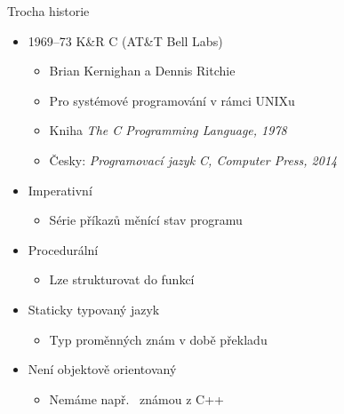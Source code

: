 \begin{frame}{Trocha historie}

  \begin{itemize}
  \item 1969--73 K\&R C (AT\&T Bell Labs)
  \begin{itemize}
    \item Brian Kernighan a Dennis Ritchie
    \item Pro systémové programování v rámci UNIXu

    \pause

    \item Kniha \textit{The C Programming Language, 1978}
    \item Česky: \textit{Programovací jazyk C, Computer Press, 2014}
  \end{itemize}

  \pause

  \item Imperativní
  \begin{itemize}
    \item Série příkazů měnící stav programu
  \end{itemize}

  \pause

  \item Procedurální
  \begin{itemize}
    \item Lze strukturovat do funkcí
  \end{itemize}

  \pause

  \item Staticky typovaný jazyk
  \begin{itemize}
    \item Typ proměnných znám v době překladu
  \end{itemize}

  \pause

  \item Není objektově orientovaný
  \begin{itemize}
    \item Nemáme např.\  známou z C++
  \end{itemize}
 \end{itemize}

\end{frame}

